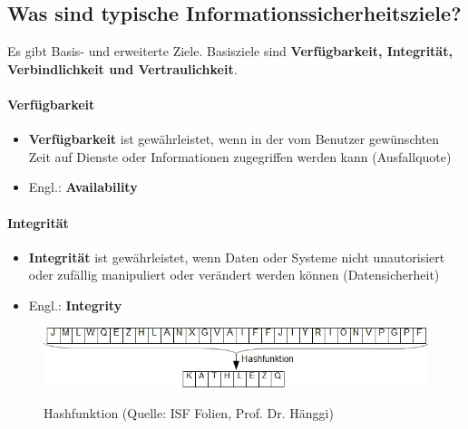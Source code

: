 \subsection*{Was sind typische Informationssicherheitsziele?}\label{sub:Informationssicherheitsziele}
Es gibt Basis- und erweiterte Ziele. Basisziele sind \textbf{Verfügbarkeit, Integrität, Verbindlichkeit und Vertraulichkeit}.
\paragraph*{Verfügbarkeit}\label{par:Availability}
\begin{itemize}
    \item \textbf{Verfügbarkeit} ist gewährleistet, wenn in der vom Benutzer gewünschten Zeit auf Dienste oder Informationen zugegriffen werden kann (Ausfallquote)
    \item Engl.: \textbf{Availability}
\end{itemize}

\paragraph*{Integrität}\label{par:Integrity}
\begin{itemize}
    \item \textbf{Integrität} ist gewährleistet, wenn Daten oder Systeme nicht unautorisiert oder zufällig manipuliert oder verändert werden können (Datensicherheit)
    \item Engl.: \textbf{Integrity}
\end{itemize}
\begin{figure}[H]
    \begin{center}
    \label{pic:Hash}
    \includegraphics[width=\textwidth]{images/hash.png}
    \caption{Hashfunktion (Quelle: ISF Folien, Prof. Dr. Hänggi)}
    \end{center}
\end{figure}

